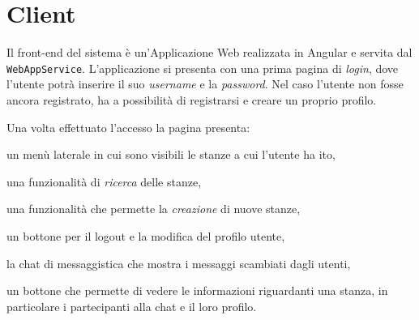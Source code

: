 \section{Client}
Il front-end del sistema è un'Applicazione Web realizzata in Angular e servita dal \texttt{WebAppService}.
L'applicazione si presenta con una prima pagina di \textit{login}, dove l'utente potrà inserire il suo \textit{username} e la \textit{password}. Nel caso l'utente non fosse ancora registrato, ha a possibilità di registrarsi e creare un proprio profilo.

Una volta effettuato l'accesso la pagina presenta:
\begin{enumerate*}[label=(\arabic*)]
    \item un menù laterale in cui sono visibili le stanze a cui l'utente ha ito,
    \item una funzionalità di \textit{ricerca} delle stanze,
    \item una funzionalità che permette la \textit{creazione} di nuove stanze,
    \item un bottone per il logout e la modifica del profilo utente,
    \item la chat di messaggistica che mostra i messaggi scambiati dagli utenti,
    \item un bottone che permette di vedere le informazioni riguardanti una stanza, in particolare i partecipanti alla chat e il loro profilo.
\end{enumerate*}

